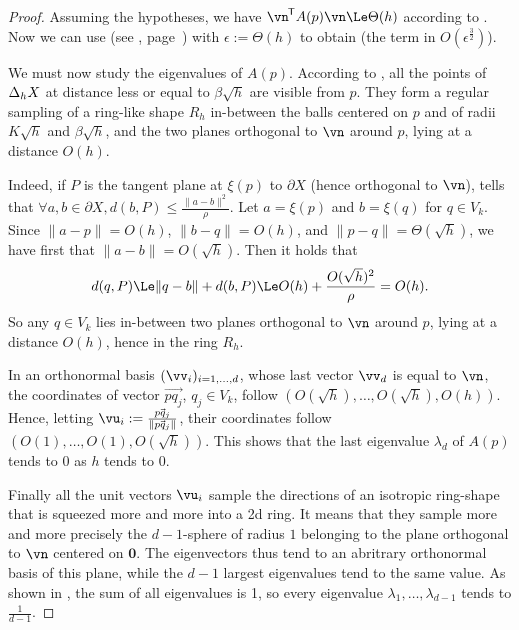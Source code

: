 \begin{proof}
    Assuming the hypotheses, we have $\TR{\vn} A(p) \vn \Le \Theta(h)$
    according to . Now we can use
     (see ,
    page~\pageref{sec-appendix}) with $\epsilon := \Theta(h)$ to obtain
     (the term in
    $O(\epsilon^{\frac{3}{2}})$).

    We must now study the eigenvalues of
    $A(p)$. According to , all the
    points of $\Delta_{h} {X}$ at distance less or equal to $\beta \sqrt{h}$
    are visible from $p$. They form a regular sampling of a ring-like
    shape $R_h$ in-between the balls centered on $p$ and of radii
    $K\sqrt{h}$ and $\beta\sqrt{h}$, and the two planes orthogonal to
    $\vn$ around $p$, lying at a distance $O(h)$.

    Indeed, if $P$ is the tangent plane at $\xi(p)$ to $\partial X$ (hence
    orthogonal to $\vn$), \cite[Lemma~10]{Boissonnat:2019-jact} tells
    that $\forall a,b \in \partial X, d(b, P) \le
    \frac{\|a-b\|^2}{\rho}$. Let $a=\xi(p)$ and $b=\xi(q)$ for $q \in
    V_k$. Since $\|a-p\|=O(h)$, $\|b-q\|=O(h)$, and
    $\|p-q\|=\Theta(\sqrt{h})$, we have first that
    $\|a-b\|=O(\sqrt{h})$. Then it holds that
    \begin{align*}
        d(q, P) \Le \|q-b\| + d(b,P) \Le O(h) + \frac{O(\sqrt{h})^2}{\rho}
        = O(h).
    \end{align*}
    So any $q \in V_k$ lies in-between two planes orthogonal to $\vn$
    around $p$, lying at a distance $O(h)$, hence in the ring $R_h$.

    In an orthonormal basis $(\vv_i)_{i=1,\ldots,d}$,
    whose last vector $\vv_d$ is equal to $\vn$, the coordinates of
    vector $\vec{pq_j}$, $q_j \in V_k$, follow $(O(\sqrt{h}), \ldots,
    O(\sqrt{h}), O(h))$. Hence, letting
    $\vu_i:=\frac{\vec{pq_j}}{\|\vec{pq_j}\|}$, their coordinates follow
    $(O(1), \ldots, O(1), O(\sqrt{h}))$. This shows that the last
    eigenvalue $\lambda_d$ of $A(p)$ tends to $0$ as $h$ tends to $0$.

    Finally all the unit vectors $\vu_i$ sample the directions of an
    isotropic ring-shape that is squeezed more and more into a 2d
    ring. It means that they sample more and more precisely the
    $d-1$-sphere of radius $1$ belonging to the plane orthogonal to
    $\vn$ centered on $\mathbf{0}$. The eigenvectors thus tend to an
    abritrary orthonormal basis of this plane, while the $d-1$ largest
    eigenvalues tend to the same value. As shown in
    , the sum of all eigenvalues is 1, so every
    eigenvalue $\lambda_1, \ldots, \lambda_{d-1}$ tends to
    $\frac{1}{d-1}$.
\end{proof}

